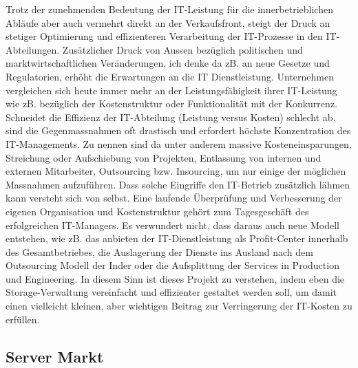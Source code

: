 Trotz der zunehmenden Bedeutung der IT-Leistung für die innerbetrieblichen Abläufe aber auch vermehrt direkt an der Verkaufsfront, steigt der Druck an stetiger Optimierung und effizienteren Verarbeitung der IT-Prozesse in den IT-Abteilungen. Zusätzlicher Druck von Aussen bezüglich politischen und marktwirtschaftlichen Veränderungen, ich denke da zB. an neue Gesetze und Regulatorien, erhöht die Erwartungen an die IT Dienstleistung.
Unternehmen vergleichen sich heute immer mehr an der Leistungsfähigkeit ihrer IT-Leistung wie zB. bezüglich der Kostenstruktur oder Funktionalität mit der Konkurrenz. Schneidet die Effizienz der IT-Abteilung (Leistung versus Kosten) schlecht ab, sind die Gegenmassnahmen oft drastisch und erfordert höchste Konzentration des IT-Managements. Zu nennen sind da unter anderem massive Kosteneinsparungen, Streichung oder Aufschiebung von Projekten, Entlassung von internen und externen Mitarbeiter, Outsourcing bzw. Insourcing, um nur einige der möglichen Massnahmen aufzuführen. Dass solche Eingriffe  den IT-Betrieb zusätzlich lähmen kann versteht sich von selbst. Eine laufende Überprüfung und Verbesserung der eigenen Organisation und Kostenstruktur gehört zum Tagesgeschäft des erfolgreichen IT-Managers. Es verwundert nicht, dass daraus auch neue Modell entstehen, wie zB. das anbieten der IT-Dienstleistung als Profit-Center innerhalb des Gesamtbetriebes, die Auslagerung der Dienste ins Ausland nach dem Outsourcing Modell der Inder oder die Aufsplittung der Services in Production und Engineering. In diesem Sinn ist dieses Projekt zu verstehen, indem eben die Storage-Verwaltung vereinfacht und effizienter gestaltet werden soll, um damit einen vielleicht kleinen, aber wichtigen Beitrag zur Verringerung der IT-Kosten zu erfüllen. 


\subsection{Server Markt}
